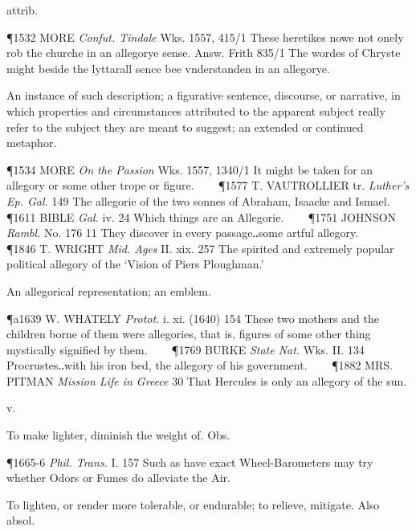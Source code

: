 \begin{description}[wide, labelwidth=!, labelindent=0pt]
\begin{myenumerate}
 attrib. 

\P 1532 MORE \textit{Confut. Tindale} Wks. 1557, 415/1 These heretikes nowe not onely rob
the churche in an allegorye sense. Answ. Frith 835/1 The wordes of Chryste
might beside the lyttarall sence bee vnderstanden in an allegorye.

 An instance of such description; a figurative sentence, discourse, or
narrative, in which properties and circumstances attributed to the apparent
subject really refer to the subject they are meant to suggest; an extended or
continued metaphor. 

\P 1534 MORE \textit{On the Passion} Wks. 1557, 1340/1 It might be taken for an allegory
or some other trope or figure.    
\P 1577 T. VAUTROLLIER tr. \textit{Luther's Ep. Gal.} 149
The allegorie of the two sonnes of Abraham, Isaacke and Ismael.    
\P 1611 BIBLE \textit{Gal.} iv. 24 Which things are an Allegorie.    
\P 1751 JOHNSON \textit{Rambl.} No. 176 11
They discover in every passage‥some artful allegory.    
\P 1846 T. WRIGHT \textit{Mid. Ages}
II. xix. 257 The spirited and extremely popular political allegory of the
‘Vision of Piers Ploughman.’

 An allegorical representation; an emblem. 

\P a1639 W. WHATELY \textit{Protot.} i. xi. (1640) 154 These two mothers and the
children borne of them were allegories, that is, figures of some other thing
mystically signified by them.    
\P 1769 BURKE \textit{State Nat.} Wks. II. 134
Procrustes‥with his iron bed, the allegory of his government.    
\P 1882 MRS. PITMAN \textit{Mission Life in Greece} 30 That Hercules is only an allegory of the sun.
\end{myenumerate}

  v.

\noindent  {}

\vspace{-0.3cm}

\begin{myenumerate}
 To make lighter, diminish the weight of. Obs. 

\P 1665-6 \textit{Phil. Trans.} I. 157 Such as have exact Wheel-Barometers may try whether Odors or Fumes do alleviate the Air.

 To lighten, or render more tolerable, or endurable; to relieve, mitigate. Also absol. 


\end{myenumerate}
\end{description}
